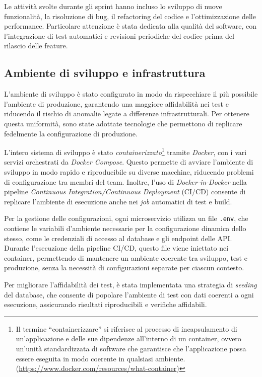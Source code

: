 Le attività svolte durante gli sprint hanno incluso lo sviluppo di nuove funzionalità, la risoluzione di bug, il refactoring del codice e l'ottimizzazione delle performance. Particolare attenzione è stata dedicata alla qualità del software, con l'integrazione di test automatici e revisioni periodiche del codice prima del rilascio delle feature.

\subsection{Ambiente di sviluppo e infrastruttura}
L'ambiente di sviluppo è stato configurato in modo da rispecchiare il più possibile l'ambiente di produzione, garantendo una maggiore affidabilità nei test e riducendo il rischio di anomalie legate a differenze infrastrutturali. Per ottenere questa uniformità, sono state adottate tecnologie che permettono di replicare fedelmente la configurazione di produzione.

L'intero sistema di sviluppo è stato \textit{containerizzato}\footnote{Il termine ``containerizzare'' si riferisce al processo di incapsulamento di un'applicazione e delle sue dipendenze all'interno di un container, ovvero un'unità standardizzata di software che garantisce che l'applicazione possa essere eseguita in modo coerente in qualsiasi ambiente. (\url{https://www.docker.com/resources/what-container})} tramite \textit{Docker}, con i vari servizi orchestrati da \textit{Docker Compose}. Questo permette di avviare l’ambiente di sviluppo in modo rapido e riproducibile su diverse macchine, riducendo problemi di configurazione tra membri del team. Inoltre, l'uso di \textit{Docker-in-Docker} nella pipeline \textit{Continuous Integration/Continuous Deployment} (CI/CD) consente di replicare l’ambiente di esecuzione anche nei \textit{job} automatici di test e build.

Per la gestione delle configurazioni, ogni microservizio utilizza un file \texttt{.env}, che contiene le variabili d’ambiente necessarie per la configurazione dinamica dello stesso, come le credenziali di accesso al database e gli endpoint delle API. Durante l’esecuzione della pipeline CI/CD, questo file viene iniettato nei container, permettendo di mantenere un ambiente coerente tra sviluppo, test e produzione, senza la necessità di configurazioni separate per ciascun contesto.

Per migliorare l'affidabilità dei test, è stata implementata una strategia di \textit{seeding} del database, che consente di popolare l’ambiente di test con dati coerenti a ogni esecuzione, assicurando risultati riproducibili e verifiche affidabili.

